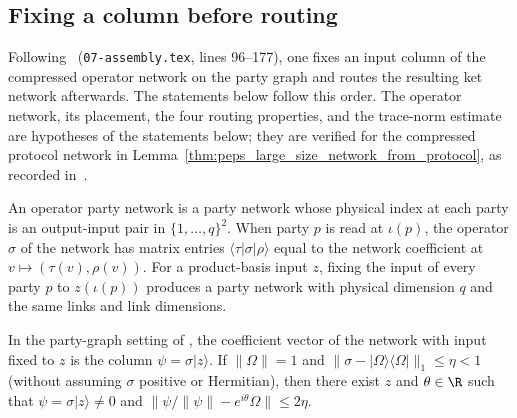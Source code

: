 \subsection{Fixing a column before routing}

Following~\cite[Section~8.2--8.3]{OpenAI2026PolynomialPEPS}
(\texttt{07-assembly.tex}, lines 96--177), one fixes an input column of the
compressed operator network on the party graph and routes the resulting ket network
afterwards. The statements below follow this
order. The operator network, its placement, the four routing properties, and
the trace-norm estimate are hypotheses of the statements below; they are
verified for the compressed protocol network in
Lemma~\ref{thm:peps_large_size_network_from_protocol}, as recorded
in~\cite{gap:polypeps_product_reference_column}.

\begin{definition}
    \label{def:peps_party_operator_fix_input}
    \leanok
    An operator party network is a party network whose physical index at each
    party is an output-input pair in $\{1,\ldots,q\}^2$. When party
    $p$ is read at $\iota(p)$, the operator $\sigma$ of the network has
    matrix entries $\langle\tau|\sigma|\rho\rangle$ equal to the network coefficient at $v\mapsto(\tau(v),\rho(v))$. For a product-basis
    input $z$, fixing the input of every party $p$ to $z(\iota(p))$ produces a party
    network with physical dimension $q$ and the same links and link
    dimensions.
\end{definition}

\begin{lemma}
    \label{thm:peps_party_column}
    \leanok
    In the party-graph setting of \cite[Lemma~8.1]{OpenAI2026PolynomialPEPS},
    the coefficient vector of the network with input fixed to $z$ is the column
    $\psi=\sigma|z\rangle$. If $\lVert\Omega\rVert=1$ and
    $\lVert\sigma-|\Omega\rangle\langle\Omega|\rVert_1\le\eta<1$ (without assuming $\sigma$ positive or Hermitian), then there exist
    $z$ and $\theta\in\R$ such that $\psi=\sigma|z\rangle\ne0$ and
    $\lVert\psi/\lVert\psi\rVert-e^{i\theta}\Omega\rVert\le2\eta$.
\end{lemma}

